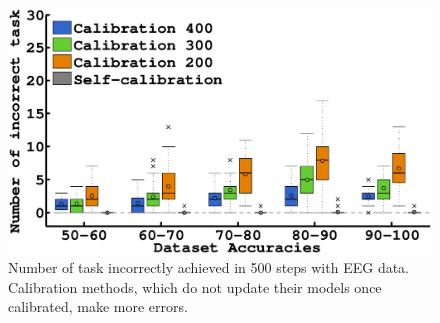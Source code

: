 \begin{figure}[!ht]
\centering
\includegraphics[width=\columnwidth]{img/plots_aaai/plot_EEG_calib_nWrong.eps}
\caption{Number of task incorrectly achieved in 500 steps with EEG data. Calibration methods, which do not update their models once calibrated, make more errors.}
\label{fig:nWrongEEG}
\end{figure}

%
%
%




